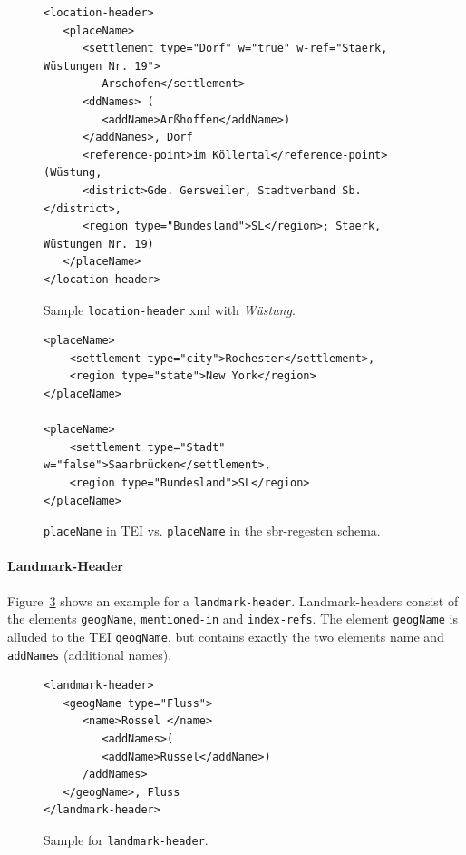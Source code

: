 \begin{figure}[H]
\centering
\begin{verbatim}
<location-header>
   <placeName>
      <settlement type="Dorf" w="true" w-ref="Staerk, Wüstungen Nr. 19">
         Arschofen</settlement>
      <ddNames> (
         <addName>Arßhoffen</addName>)
      </addNames>, Dorf 
      <reference-point>im Köllertal</reference-point> (Wüstung, 
      <district>Gde. Gersweiler, Stadtverband Sb.</district>, 
      <region type="Bundesland">SL</region>; Staerk, Wüstungen Nr. 19) 
   </placeName>
</location-header>
\end{verbatim}
\label{fig:location-wuest-xml}
\caption{Sample \texttt{location-header} xml with \textit{Wüstung}.}
\end{figure}

\begin{figure}[H]
\centering
\begin{verbatim}
<placeName>
    <settlement type="city">Rochester</settlement>,
    <region type="state">New York</region>
</placeName>

<placeName>
    <settlement type="Stadt" w="false">Saarbrücken</settlement>,
    <region type="Bundesland">SL</region>
</placeName>
\end{verbatim}
\label{fig:placeName}
\caption{\texttt{placeName} in TEI vs. \texttt{placeName} in the sbr-regesten schema.}
\end{figure}


\paragraph{Landmark-Header}
Figure~\ref{fig:landmark-header-xml} shows an example for a \texttt{landmark-header}. Landmark-headers consist of the elements \texttt{geogName}, \texttt{mentioned-in} and \texttt{index-refs}. The element \texttt{geogName} is alluded to the TEI \texttt{geogName}, but contains exactly the two elements name and \texttt{addNames} (additional names).

\begin{figure}[H]
\centering
\begin{verbatim}
<landmark-header>
   <geogName type="Fluss">
      <name>Rossel </name>
         <addNames>(
         <addName>Russel</addName>)
      /addNames>
   </geogName>, Fluss 
</landmark-header>
\end{verbatim}
\label{fig:landmark-header-xml}
\caption{Sample for \texttt{landmark-header}.}
\end{figure}

